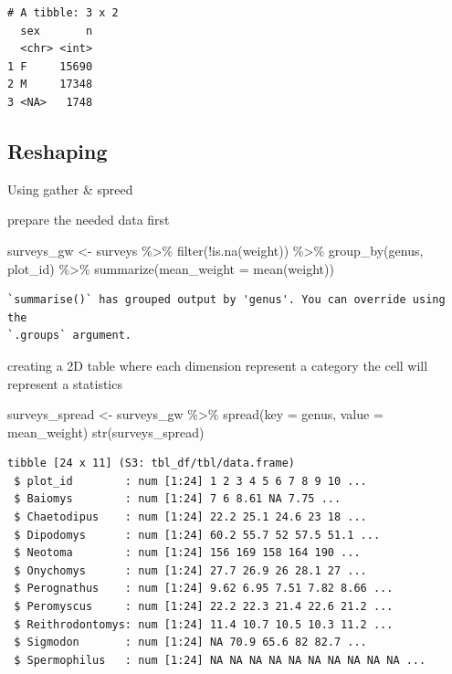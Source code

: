\documentclass[
  letterpaper,
  DIV=11,
  numbers=noendperiod]{scrreprt}
\newenvironment{Shaded}{\begin{snugshade}}{\end{snugshade}}
\newcommand{\AttributeTok}[1]{\textcolor[rgb]{0.40,0.45,0.13}{#1}}
\newcommand{\FunctionTok}[1]{\textcolor[rgb]{0.28,0.35,0.67}{#1}}
\newcommand{\NormalTok}[1]{\textcolor[rgb]{0.00,0.23,0.31}{#1}}
\newcommand{\OtherTok}[1]{\textcolor[rgb]{0.00,0.23,0.31}{#1}}
\newcommand{\SpecialCharTok}[1]{\textcolor[rgb]{0.37,0.37,0.37}{#1}}
\begin{document}
\begin{verbatim}
# A tibble: 3 x 2
  sex       n
  <chr> <int>
1 F     15690
2 M     17348
3 <NA>   1748
\end{verbatim}

\subsection{Reshaping}\label{reshaping}

Using gather \& spreed

prepare the needed data first

\begin{Shaded}
\begin{Highlighting}[]
\NormalTok{surveys\_gw }\OtherTok{\textless{}{-}}\NormalTok{ surveys }\SpecialCharTok{\%\textgreater{}\%}
  \FunctionTok{filter}\NormalTok{(}\SpecialCharTok{!}\FunctionTok{is.na}\NormalTok{(weight)) }\SpecialCharTok{\%\textgreater{}\%}
  \FunctionTok{group\_by}\NormalTok{(genus, plot\_id) }\SpecialCharTok{\%\textgreater{}\%}
  \FunctionTok{summarize}\NormalTok{(}\AttributeTok{mean\_weight =} \FunctionTok{mean}\NormalTok{(weight))}
\end{Highlighting}
\end{Shaded}

\begin{verbatim}
`summarise()` has grouped output by 'genus'. You can override using the
`.groups` argument.
\end{verbatim}

creating a 2D table where each dimension represent a category the cell
will represent a statistics

\begin{Shaded}
\begin{Highlighting}[]
\NormalTok{surveys\_spread }\OtherTok{\textless{}{-}}\NormalTok{ surveys\_gw }\SpecialCharTok{\%\textgreater{}\%}
  \FunctionTok{spread}\NormalTok{(}\AttributeTok{key =}\NormalTok{ genus, }\AttributeTok{value =}\NormalTok{ mean\_weight)}
\FunctionTok{str}\NormalTok{(surveys\_spread)}
\end{Highlighting}
\end{Shaded}

\begin{verbatim}
tibble [24 x 11] (S3: tbl_df/tbl/data.frame)
 $ plot_id        : num [1:24] 1 2 3 4 5 6 7 8 9 10 ...
 $ Baiomys        : num [1:24] 7 6 8.61 NA 7.75 ...
 $ Chaetodipus    : num [1:24] 22.2 25.1 24.6 23 18 ...
 $ Dipodomys      : num [1:24] 60.2 55.7 52 57.5 51.1 ...
 $ Neotoma        : num [1:24] 156 169 158 164 190 ...
 $ Onychomys      : num [1:24] 27.7 26.9 26 28.1 27 ...
 $ Perognathus    : num [1:24] 9.62 6.95 7.51 7.82 8.66 ...
 $ Peromyscus     : num [1:24] 22.2 22.3 21.4 22.6 21.2 ...
 $ Reithrodontomys: num [1:24] 11.4 10.7 10.5 10.3 11.2 ...
 $ Sigmodon       : num [1:24] NA 70.9 65.6 82 82.7 ...
 $ Spermophilus   : num [1:24] NA NA NA NA NA NA NA NA NA NA ...
\end{verbatim}
\end{document}
